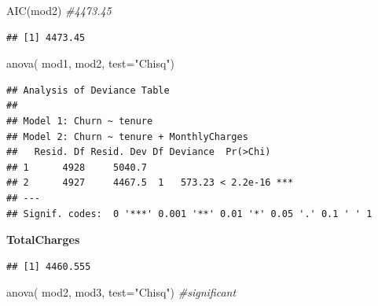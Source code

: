 \documentclass[
  twoside]{article}
\newenvironment{Shaded}{\begin{snugshade}}{\end{snugshade}}
\newcommand{\AttributeTok}[1]{\textcolor[rgb]{0.77,0.63,0.00}{#1}}
\newcommand{\CommentTok}[1]{\textcolor[rgb]{0.56,0.35,0.01}{\textit{#1}}}
\newcommand{\FunctionTok}[1]{\textcolor[rgb]{0.00,0.00,0.00}{#1}}
\newcommand{\NormalTok}[1]{#1}
\newcommand{\OtherTok}[1]{\textcolor[rgb]{0.56,0.35,0.01}{#1}}
\newcommand{\SpecialCharTok}[1]{\textcolor[rgb]{0.00,0.00,0.00}{#1}}
\newcommand{\StringTok}[1]{\textcolor[rgb]{0.31,0.60,0.02}{#1}}
\begin{document}
\begin{Shaded}
\begin{Highlighting}[]
\FunctionTok{AIC}\NormalTok{(mod2) }\CommentTok{\#4473.45}
\end{Highlighting}
\end{Shaded}

\begin{verbatim}
## [1] 4473.45
\end{verbatim}

\begin{Shaded}
\begin{Highlighting}[]
\FunctionTok{anova}\NormalTok{( mod1, mod2,  }\AttributeTok{test=}\StringTok{"Chisq"}\NormalTok{)}
\end{Highlighting}
\end{Shaded}

\begin{verbatim}
## Analysis of Deviance Table
## 
## Model 1: Churn ~ tenure
## Model 2: Churn ~ tenure + MonthlyCharges
##   Resid. Df Resid. Dev Df Deviance  Pr(>Chi)    
## 1      4928     5040.7                          
## 2      4927     4467.5  1   573.23 < 2.2e-16 ***
## ---
## Signif. codes:  0 '***' 0.001 '**' 0.01 '*' 0.05 '.' 0.1 ' ' 1
\end{verbatim}

\textbf{TotalCharges}

\begin{Shaded}
\end{Shaded}

\begin{verbatim}
## [1] 4460.555
\end{verbatim}

\begin{Shaded}
\begin{Highlighting}[]
\FunctionTok{anova}\NormalTok{( mod2, mod3,  }\AttributeTok{test=}\StringTok{"Chisq"}\NormalTok{) }\CommentTok{\#significant}
\end{Highlighting}
\end{Shaded}
\end{document}
